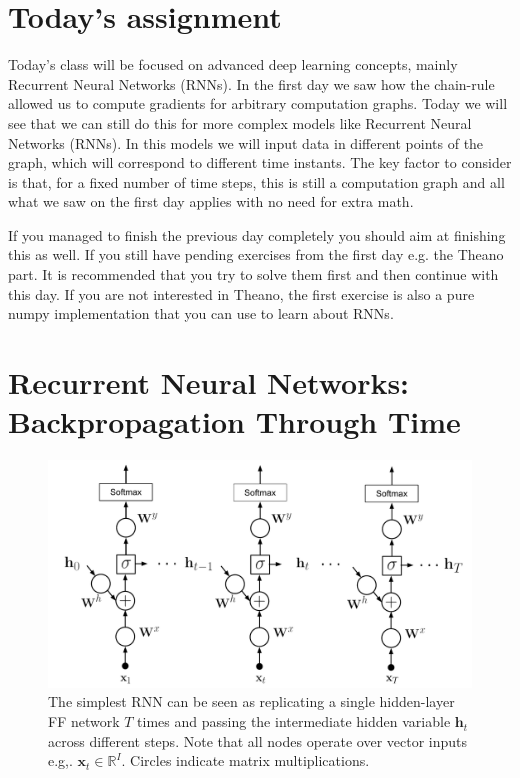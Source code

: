 \section{Today's assignment}
Today's class will be focused on advanced deep learning concepts, mainly
Recurrent Neural Networks (RNNs).  In the first day we saw how the chain-rule
allowed us to compute gradients for arbitrary computation graphs. Today we will
see that we can still do this for more complex models like Recurrent Neural
Networks (RNNs). In this models we will input data in different points of the
graph, which will correspond to different time instants. The key factor to
consider is that, for a fixed number of time steps, this is still a computation
graph and all what we saw on the first day applies with no need for extra math.

If you managed to finish the previous day completely you should aim at finishing
this as well. If you still have pending exercises from the first day e.g. the
Theano part. It is recommended that you try to solve them first and then
continue with this day. If you are not interested in Theano, the first exercise is
also a pure numpy implementation that you can use to learn about RNNs.

\section{Recurrent Neural Networks: Backpropagation Through Time}

\begin{figure}[!h]
\centering
\includegraphics[scale=0.6]{figs/deep_learning/RNN.pdf}
\caption{The simplest RNN can be seen as replicating a single hidden-layer FF network $T$ times and passing the intermediate hidden variable $\mathbf{h}_t$ across different steps. Note that all nodes operate over vector inputs e.g,. $\mathbf{x}_t \in \mathbb{R}^I$. Circles indicate matrix multiplications.}
\label{fig:RNN}
\end{figure}



